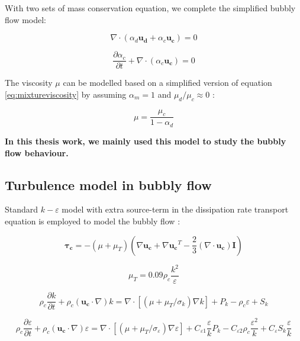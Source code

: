 With two sets of mass conservation equation, we complete the simplified bubbly flow model:

\begin{equation}\label{eq:bubbly3}
    \nabla \cdot (\alpha_d \mathbf{u_d} + \alpha_c \mathbf{u_c}) = 0
\end{equation}

\begin{equation}\label{eq:bubbly4}
    \frac{\partial \alpha_c}{ \partial t} + \nabla \cdot (\alpha_c \mathbf{u_c}) = 0
\end{equation}

The viscosity $\mu$ can be modelled based on a simplified version of equation \ref{eq:mixtureviscosity} by assuming $\alpha_m = 1$ and $\mu_d/\mu_c \approx 0$ \cite{ANSYSFLUENT13UsersGuide2013,Wedin2001}:

\begin{equation}\label{eq:bubbly5}
    \mu = \frac{\mu_c}{1-\alpha_d}
\end{equation}

\textbf{In this thesis work, we mainly used this model to study the bubbly flow behaviour.}

\subsection{ Turbulence model in bubbly flow}\label{turbulentmodel}

Standard $k-\varepsilon$ model with extra source-term in the dissipation rate transport equation is employed to model the bubbly flow \cite{COMSOL2016}:

\begin{equation}
    \mathbf{τ_c} = -(\mu + \mu _T) (\nabla \mathbf{u_c} + \nabla \mathbf{u_c}^T-\frac{2}{3}(\nabla \cdot \mathbf{u_c})\mathbf{I})
\end{equation}

\begin{equation}
    \mu_T = 0.09 \rho_c \frac{k^2}{\varepsilon}
\end{equation}

\begin{equation}
    \rho_c \frac{\partial k}{\partial t} + \rho_c (\mathbf{u_c} \cdot \nabla) k = \nabla \cdot [(\mu + \mu_T /\sigma_k)\nabla k] + P_k - \rho_c \varepsilon +S_k
\end{equation}

\begin{equation}
    \rho_c \frac{\partial \varepsilon}{\partial t} + \rho_c (\mathbf{u_c} \cdot \nabla) \varepsilon = \nabla \cdot [(\mu + \mu_T /\sigma_{\varepsilon})\nabla \varepsilon] + C_{\varepsilon1} \frac{\varepsilon}{k} P_k - C_{\varepsilon2} \rho_c \frac{\varepsilon^2}{k} + C_{\varepsilon} S_k \frac{\varepsilon}{k}
\end{equation}

